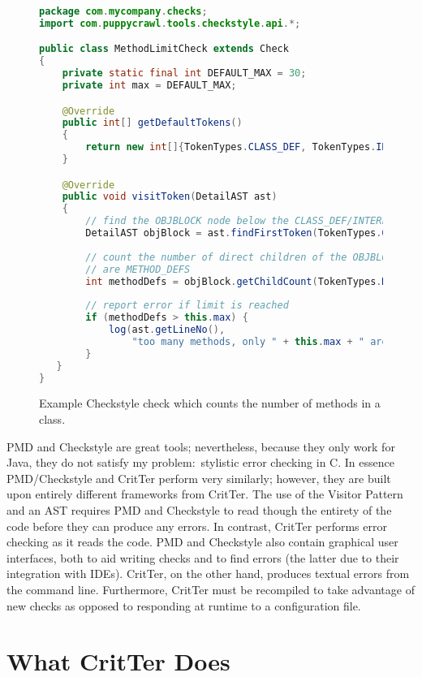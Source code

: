 \documentclass[12pt]{report}
\newcommand{\programName}{CritTer\xspace}
\begin{document}
\begin{figure}
\begin{lstlisting}[language=Java]
package com.mycompany.checks;
import com.puppycrawl.tools.checkstyle.api.*;

public class MethodLimitCheck extends Check
{
    private static final int DEFAULT_MAX = 30;
    private int max = DEFAULT_MAX;

    @Override
    public int[] getDefaultTokens()
    {
        return new int[]{TokenTypes.CLASS_DEF, TokenTypes.INTERFACE_DEF};
    }

    @Override
    public void visitToken(DetailAST ast)
    {
        // find the OBJBLOCK node below the CLASS_DEF/INTERFACE_DEF
        DetailAST objBlock = ast.findFirstToken(TokenTypes.OBJBLOCK);
        
        // count the number of direct children of the OBJBLOCK that 
        // are METHOD_DEFS
        int methodDefs = objBlock.getChildCount(TokenTypes.METHOD_DEF);
        
        // report error if limit is reached
        if (methodDefs > this.max) {
            log(ast.getLineNo(),
                "too many methods, only " + this.max + " are allowed");
        }
   }
}
\end{lstlisting}
\caption[Example Checkstyle Check]{Example Checkstyle check which counts the number of methods in a class.}
\label{checkstyle-rule}
\end{figure}

PMD and Checkstyle are great tools; nevertheless, because they only work for Java, they do not satisfy 
my problem:\ stylistic error checking in C. In essence PMD\slash Checkstyle and \programName perform 
very similarly; however, they are built upon entirely different frameworks from \programName. The use of 
the Visitor Pattern and an AST requires PMD and Checkstyle to read though the entirety of the code 
before they can produce any errors. In contrast, \programName performs error checking as it reads the 
code. PMD and Checkstyle also contain graphical user interfaces, both to aid writing checks and to find 
errors (the latter due to their integration with IDEs). \programName, on the other hand, produces textual 
errors from the command line. Furthermore, \programName must be recompiled to take advantage of 
new checks as opposed to responding at runtime to a configuration file.

\chapter{What \programName Does}
\end{document}
